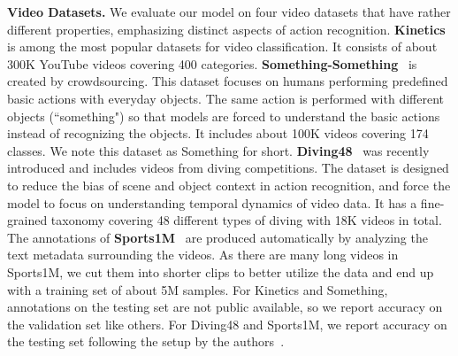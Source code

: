 \documentclass[10pt,twocolumn,letterpaper]{article}
\begin{document}
\noindent\textbf{Video Datasets.} We evaluate our model on four video datasets that have rather different properties, emphasizing distinct aspects of action recognition.
{\bf Kinetics}~\cite{kinetics} 
is among the most popular datasets for video classification. It consists of about 300K YouTube videos covering 400 categories. 
{\bf Something-Something}~\cite{goyal2017something} is created by crowdsourcing. This dataset focuses on humans performing predefined basic actions with everyday objects. The same action is performed with different objects (``something") so that models are forced to understand the basic actions instead of recognizing the objects.  It includes about 100K videos covering 174 classes. 
 We note this dataset as Something for short. {\bf Diving48}~\cite{li2018resound} was recently introduced and includes videos from diving competitions. The dataset is designed to reduce the bias of scene and object context in action recognition, and force the model to focus on understanding temporal dynamics of video data. It has a fine-grained taxonomy covering 48 different types of diving with 18K videos in total. The annotations of {\bf Sports1M}~\cite{Karpathy14} are produced automatically by analyzing
the text metadata surrounding the videos. As there are many long videos in Sports1M, we cut them into shorter clips to better utilize the data
and end up with a training set of about 5M samples. For Kinetics and Something, annotations on the testing set are not public available, so we report accuracy on the validation set like others. For Diving48 and Sports1M, we report accuracy on the testing set following the setup by the authors~\cite{li2018resound,Karpathy14}.
\end{document}
